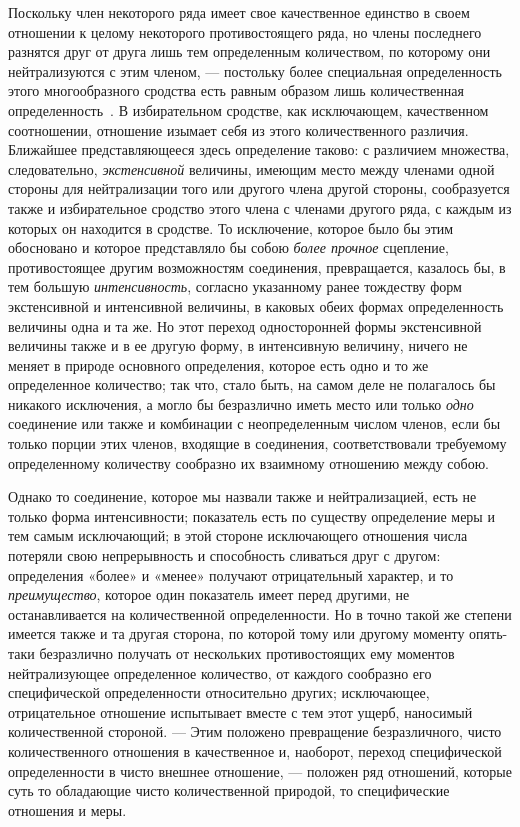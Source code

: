 Поскольку член некоторого ряда имеет свое качественное единство в своем
отношении к целому некоторого противостоящего ряда, но члены последнего
разнятся друг от друга лишь тем определенным количеством, по которому они
нейтрализуются с этим членом, — постольку более специальная определенность
этого многообразного сродства есть равным образом лишь количественная
определенность~\label{bkm:Ref474666676}.
В избирательном сродстве, как исключающем, качественном соотношении,
отношение изымает себя из этого количественного различия. Ближайшее
представляющееся здесь определение таково: с различием множества,
следовательно, {\em экстенсивной} величины, имеющим
место между членами одной стороны для нейтрализации того или другого члена
другой стороны, сообразуется также и избирательное сродство этого члена с
членами другого ряда, с каждым из которых он находится в сродстве. То
исключение, которое было бы этим обосновано и которое представляло бы собою
{\em более прочное} сцепление, противостоящее другим
возможностям соединения, превращается, казалось бы, в тем большую
{\em интенсивность}, согласно указанному ранее
тождеству форм экстенсивной и интенсивной величины, в каковых обеих формах
определенность величины одна и та же. Но этот переход односторонней формы
экстенсивной величины также и в ее другую форму, в интенсивную величину,
ничего не меняет в природе основного определения, которое есть одно и то же
определенное количество; так что, стало быть, на самом деле не полагалось
бы никакого исключения, а могло бы безразлично иметь место или только
{\em одно} соединение или также и комбинации с
неопределенным числом членов, если бы только порции этих членов, входящие в
соединения, соответствовали требуемому определенному количеству сообразно
их взаимному отношению между собою.

Однако то соединение, которое мы назвали также и нейтрализацией, есть не
только форма интенсивности; показатель есть по существу определение меры и
тем самым исключающий; в этой стороне исключающего отношения числа потеряли
свою непрерывность и способность сливаться друг с другом: определения
«более» и «менее» получают отрицательный характер, и то
{\em преимущество}, которое один показатель имеет перед
другими, не останавливается на количественной определенности. Но в точно
такой же степени имеется также и та другая сторона, по которой тому или
другому моменту опять-таки безразлично получать от нескольких
противостоящих ему моментов нейтрализующее определенное количество, от
каждого сообразно его специфической определенности относительно других;
исключающее, отрицательное отношение испытывает вместе с тем этот ущерб,
наносимый количественной стороной. — Этим положено превращение
безразличного, чисто количественного отношения в качественное и, наоборот,
переход специфической определенности в чисто внешнее отношение, — положен
ряд отношений, которые суть то обладающие чисто количественной природой, то
специфические отношения и меры.

